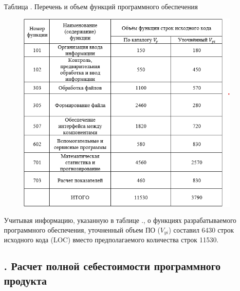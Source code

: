 {	\begin{flushleft}
		\par \centering Таблица \thechaptercntr .\thetablecntr \spc {--} Перечень и объем функций программного обеспечения
	\end{flushleft}

	\begin{figure}
		\centering
		\def\svgwidth{\textwidth}
		\includegraphics[scale=1.0]{images/elonomT1.png}
		\label{fig:ekonomT1}
	\end{figure}

	\par \redline Учитывая информацию, указанную в таблице \thechaptercntr .\thetablecntr \spc, о функциях разрабатываемого программного обеспечения, уточненный объем ПО ($V_{yi}$) составил 6430 строк исходного кода (LOC) вместо предполагаемого количества строк 11530. \addtocounter{tablecntr}{1}
	
	\par
}

\subtitlespace

\subsection*{ 
	\gostTitleFont
	\redline
	\thechaptercntr .\thesubchaptercntr \spc
	Расчет полной себестоимости программного продукта
} \addtocounter{subchaptercntr}{1}

\subtitlespace

